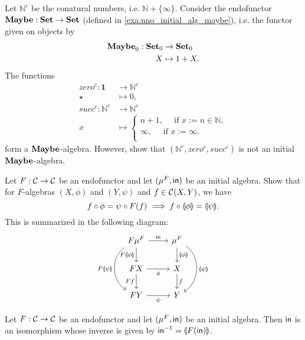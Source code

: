 \begin{exer}\label{exer:conatural_numbers_are_not_initial}
Let $\mathbb{N}^{c}$ be the conatural numbers, i.e. $\mathbb{N} + \{\infty\}$. Consider the endofunctor $\mathbf{Maybe} : \mathbf{Set} \to \mathbf{Set}$ (defined in \cref{exa:nno_initial_alg_maybe}), i.e. the functor given on objects by
\begin{align*}
  {\mathbf{Maybe}}_0 : {\mathbf{Set}}_0 &\to {\mathbf{Set}}_0
  \\
  X &\mapsto 1 + X.
\end{align*}
The functions
\begin{align*}
zero^{c} : \mathbf{1}&\to \mathbb{N}^{c} \\ 
           \star&\mapsto 0,\\
succ^{c} : \mathbb{N}^{c}&\to \mathbb{N}^{c} \\
          x & \mapsto 
\begin{cases}
n+1,\quad  \text{ if } x := n\in\mathbb{N},\\
\infty,\quad  \text{ if } x := \infty.\\
\end{cases}
\end{align*}
form a $\mathbf{Maybe}$-algebra. However, show that $(\mathbb{N}^{c},zero^{c},succ^{c})$ is not an initial $\mathbf{Maybe}$-algebra.
\end{exer}

\begin{exer}\label{exer:fusion-property}
  Let $F:\mathcal{C}\to\mathcal{C}$ be an endofunctor and let $(\mu^{F}, \mathsf{in})$ be an initial algebra. Show that
  for $F$-algebras $(X,\phi)$ and $(Y,\psi)$ and $f\in{\mathcal{C}}(X,Y)$, we have 
\[
f \circ \phi = \psi \circ F(f) \implies f \circ \llparenthesis \phi \rrparenthesis = \llparenthesis \psi \rrparenthesis.
\]
This is summarized in the following diagram:
\begin{equation}\label{eq:initial-f-alg-composition}
\begin{tikzcd}
F\Initalg{F} 
\arrow[r, "\In"] 
\arrow[d,swap, "F\catam{\phi}"]
\ar[dd, bend right=60, "F\catam{\psi}"']
&
\Initalg{F}
\arrow[d, "\catam{\phi}"]
\ar[dd, bend left=60, "\catam{\psi}"]
\\
FX
\arrow[r, swap, "\phi"]
\ar[d, "Ff"'] 
&
X \ar[d, "f"]
\\
FY \ar[r, "\psi"']
&
Y
\end{tikzcd}
\end{equation}
\end{exer}

\begin{exer} Let $F:\mathcal{C}\to\mathcal{C}$ be an endofunctor and let $(\mu^F, \mathsf{in})$ be an initial algebra.
  Then $\mathsf{in}$ is an isomorphism whose inverse is given by $\mathsf{in} ^{-1} = \llparenthesis F(\mathsf{in}) \rrparenthesis$.
\end{exer}

